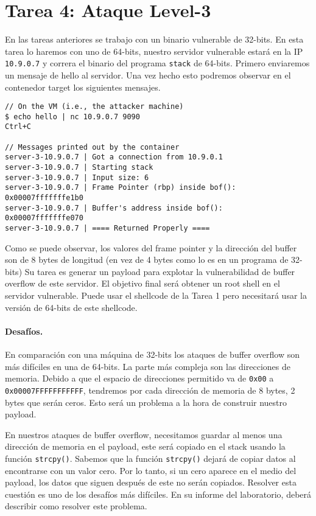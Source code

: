 \section{Tarea 4: Ataque Level-3} 

En las tareas anteriores se trabajo con un binario vulnerable de 32-bits. En esta tarea lo haremos con uno de 64-bits, nuestro servidor vulnerable estará en la IP \texttt{10.9.0.7} y correra el binario del programa  \texttt{stack} de 64-bits.
Primero enviaremos un mensaje de hello al servidor.
Una vez hecho esto podremos observar en el contenedor target los siguientes mensajes.

\begin{lstlisting}
// On the VM (i.e., the attacker machine)
$ echo hello | nc 10.9.0.7 9090
Ctrl+C

// Messages printed out by the container
server-3-10.9.0.7 | Got a connection from 10.9.0.1
server-3-10.9.0.7 | Starting stack
server-3-10.9.0.7 | Input size: 6
server-3-10.9.0.7 | Frame Pointer (rbp) inside bof():  0x00007fffffffe1b0
server-3-10.9.0.7 | Buffer's address inside bof():     0x00007fffffffe070
server-3-10.9.0.7 | ==== Returned Properly ====
\end{lstlisting}

Como se puede observar, los valores del frame pointer y la dirección del buffer son de 8 bytes de longitud (en vez de 4 bytes como lo es en un programa de 32-bits)
Su tarea es generar un payload para explotar la vulnerabilidad de buffer overflow de este servidor.
El objetivo final será obtener un root shell en el servidor vulnerable. Puede usar el shellcode de la Tarea 1 pero necesitará usar la versión de 64-bits de este shellcode.


\paragraph{Desafíos.} En comparación con una máquina de 32-bits los ataques de buffer overflow son más difíciles en una de 64-bits. La parte más compleja son las direcciones de memoria. Debido a que el espacio de direcciones permitido va de \texttt{0x00} a \texttt{0x00007FFFFFFFFFFF}, tendremos por cada dirección de memoria de 8 bytes, 2 bytes que serán ceros.
Esto será un problema a la hora de construir nuestro payload.

En nuestros ataques de buffer overflow, necesitamos guardar al menos una dirección de memoria en el payload, este será copiado en el stack usando la función \texttt{strcpy()}. Sabemos que la función \texttt{strcpy()} dejará de copiar datos al encontrarse con un valor cero. Por lo tanto, si un cero
aparece en el medio del payload, los datos que siguen después de este no serán copiados. Resolver esta cuestión es uno de los desafíos más difíciles.
En su informe del laboratorio, deberá describir como resolver este problema.


